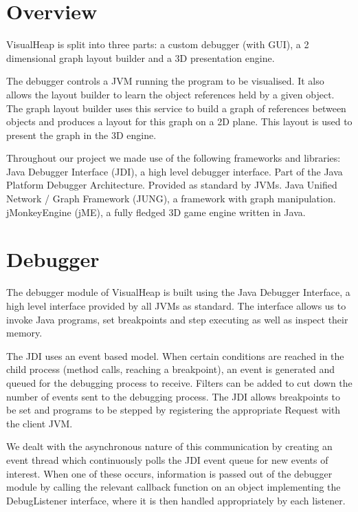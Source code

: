 \documentclass[11pt, a4paper]{report}
\begin{document}
\section{Overview}

VisualHeap is split into three parts: a custom debugger (with GUI), a 2 dimensional graph layout builder and a 3D presentation engine.

The debugger controls a JVM running the program to be visualised. It also allows the layout builder to learn the object references held by a given object. The graph layout builder uses this service to build a graph of references between objects and produces a layout for this graph on a 2D plane. This layout is used to present the graph in the 3D engine.

Throughout our project we made use of the following frameworks and libraries:     
Java Debugger Interface (JDI), a high level debugger interface. Part of the Java Platform Debugger Architecture. Provided as standard by JVMs.
Java Unified Network / Graph Framework (JUNG), a framework with graph manipulation.
jMonkeyEngine (jME), a fully fledged 3D game engine written in Java.

\section{Debugger}

The debugger module of VisualHeap is built using the Java Debugger Interface, a high level interface provided by all JVMs as standard. The interface allows us to invoke Java programs, set breakpoints and step executing as well as inspect their memory.

The JDI uses an event based model. When certain conditions are reached in the child process (method calls, reaching a breakpoint), an event is generated and queued for the debugging process to receive. Filters can be added to cut down the number of events sent to the debugging process. The JDI allows breakpoints to be set and programs to be stepped by registering the appropriate Request with the client JVM.

We dealt with the asynchronous nature of this communication by creating an event thread which continuously polls the JDI event queue for new events of interest. When one of these occurs, information is passed out of the debugger module by calling the relevant callback function on an object implementing the DebugListener interface, where it is then handled appropriately by each listener.
\end{document}
